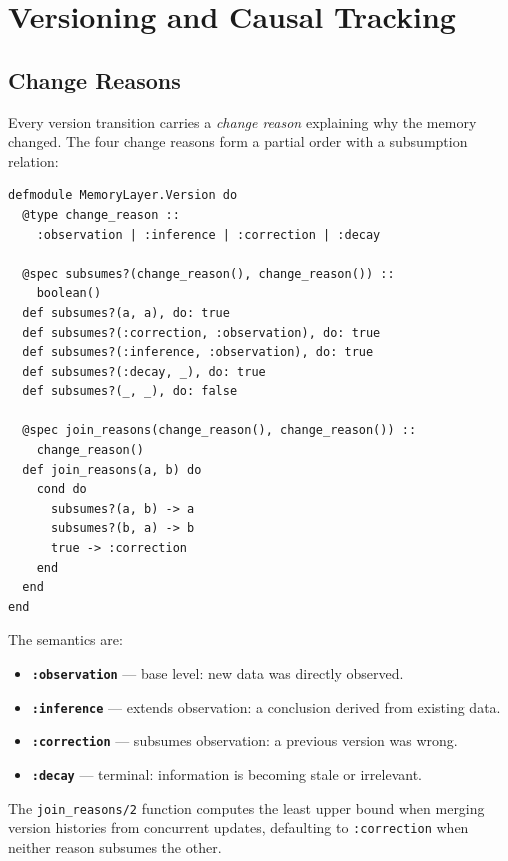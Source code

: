 \documentclass[12pt,a4paper]{article}
\theoremstyle{definition}
\begin{document}
\section{Versioning and Causal Tracking}\label{sec:versioning}

\subsection{Change Reasons}\label{subsec:change-reasons}

Every version transition carries a \emph{change reason} explaining why the memory changed.
The four change reasons form a partial order with a subsumption relation:

\begin{lstlisting}[caption={Change reasons with subsumption ordering.}, label={lst:change-reasons}]
defmodule MemoryLayer.Version do
  @type change_reason ::
    :observation | :inference | :correction | :decay

  @spec subsumes?(change_reason(), change_reason()) ::
    boolean()
  def subsumes?(a, a), do: true
  def subsumes?(:correction, :observation), do: true
  def subsumes?(:inference, :observation), do: true
  def subsumes?(:decay, _), do: true
  def subsumes?(_, _), do: false

  @spec join_reasons(change_reason(), change_reason()) ::
    change_reason()
  def join_reasons(a, b) do
    cond do
      subsumes?(a, b) -> a
      subsumes?(b, a) -> b
      true -> :correction
    end
  end
end
\end{lstlisting}

The semantics are:
\begin{itemize}
  \item \textbf{\texttt{:observation}} --- base level: new data was directly observed.
  \item \textbf{\texttt{:inference}} --- extends observation: a conclusion derived from existing data.
  \item \textbf{\texttt{:correction}} --- subsumes observation: a previous version was wrong.
  \item \textbf{\texttt{:decay}} --- terminal: information is becoming stale or irrelevant.
\end{itemize}

The \texttt{join\_reasons/2} function computes the least upper bound when merging version histories from concurrent updates, defaulting to \texttt{:correction} when neither reason subsumes the other.
\end{document}

